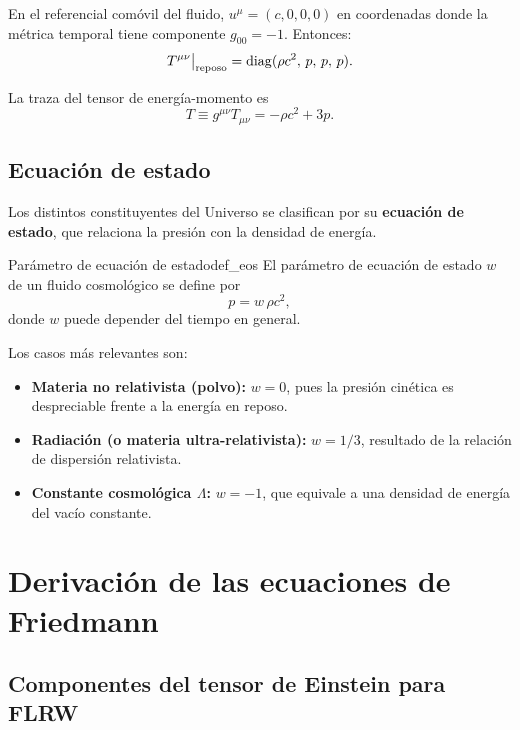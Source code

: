 En el referencial comóvil del fluido, $u^\mu=(c,0,0,0)$ en coordenadas donde la métrica temporal tiene componente $g_{00}=-1$. Entonces:
\begin{equation}
  T^{\mu\nu}\big|_{\rm reposo} = \mathrm{diag}(\rho c^2,\, p,\, p,\, p).
\end{equation}

La traza del tensor de energía-momento es
\begin{equation}
  T \equiv g^{\mu\nu}T_{\mu\nu} = -\rho c^2 + 3p.
\end{equation}

\subsection{Ecuación de estado}

Los distintos constituyentes del Universo se clasifican por su \textbf{ecuación de estado}, que relaciona la presión con la densidad de energía.

\begin{definicion}{Parámetro de ecuación de estado}{def_eos}
El parámetro de ecuación de estado $w$ de un fluido cosmológico se define por
\begin{equation}
  p = w\,\rho c^2,
  \label{eq:eos}
\end{equation}
donde $w$ puede depender del tiempo en general.
\end{definicion}

Los casos más relevantes son:
\begin{itemize}[leftmargin=2em]
  \item \textbf{Materia no relativista (polvo):} $w=0$, pues la presión cinética es despreciable frente a la energía en reposo.
  \item \textbf{Radiación (o materia ultra-relativista):} $w=1/3$, resultado de la relación de dispersión relativista.
  \item \textbf{Constante cosmológica $\Lambda$:} $w=-1$, que equivale a una densidad de energía del vacío constante.
\end{itemize}

\section{Derivación de las ecuaciones de Friedmann}
\label{sec:derivacion_friedmann}

\subsection{Componentes del tensor de Einstein para FLRW}

